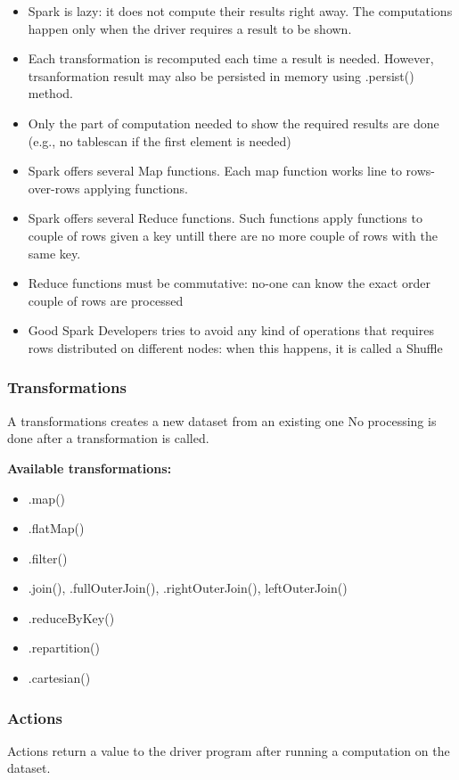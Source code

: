 \begin{itemize}
	\item Spark is lazy: it does not compute their results right away. The computations happen only when the driver requires a result to be shown.
	\item Each transformation is recomputed each time a result is needed. However, trsanformation result may also be persisted in memory using .persist() method.
	\item Only the part of computation needed to show the required results are done (e.g., no tablescan if the first element is needed)
	\item Spark offers several Map functions. Each map function works line to rows-over-rows applying functions.
	\item Spark offers several Reduce functions. Such functions apply functions to couple of rows given a key untill there are no more couple of rows with the same key.
	\item Reduce functions must be commutative: no-one can know the exact order couple of rows are processed
	\item Good Spark Developers tries to avoid any kind of operations that requires rows distributed on different nodes: when this happens, it is called a Shuffle
\end{itemize}

\subsubsection{Transformations}

A transformations creates a new dataset from an existing one
No processing is done after a transformation is called.

\textbf{Available transformations:}
\begin{itemize}
	\item .map()
	\item .flatMap()
	\item .filter()
	\item .join(), .fullOuterJoin(), .rightOuterJoin(), leftOuterJoin()
	\item .reduceByKey()
	\item .repartition()
	\item .cartesian()
\end{itemize}

\subsubsection{Actions}
Actions return a value to the driver program after running a computation on the dataset.


